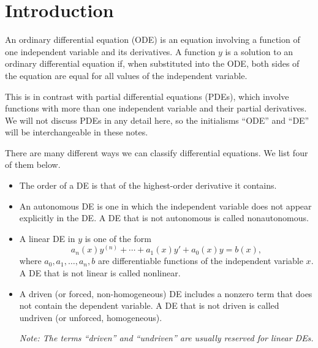 \documentclass[../m082main.tex]{subfiles}
\begin{document}
\chapter{Introduction}

\begin{definition}
    An ordinary differential equation (ODE) is an equation involving a function of one independent variable and its derivatives.
    A function $y$ is a solution to an ordinary differential equation if, when substituted into the ODE, both sides of the equation are equal for all values of the independent variable.
\end{definition}

This is in contrast with partial differential equations (PDEs), which involve functions with more than one independent variable and their partial derivatives.
We will not discuss PDEs in any detail here, so the initialisms ``ODE'' and ``DE'' will be interchangeable in these notes.

There are many different ways we can classify differential equations.
We list four of them below.

\begin{definition}
    \begin{itemize}
        \item The order of a DE is that of the highest-order derivative it contains.

        \item An autonomous DE is one in which the independent variable does not appear explicitly in the DE.
        A DE that is not autonomous is called nonautonomous.

        \item A linear DE in $y$ is one of the form
        \[ a_n(x)y^{(n)} + \cdots + a_1(x)y' + a_0(x)y = b(x), \]
        where $a_0, a_1, \ldots, a_n, b$ are differentiable functions of the independent variable $x$.
        A DE that is not linear is called nonlinear.

        \item A driven (or forced, non-homogeneous) DE includes a nonzero term that does not contain the dependent variable.
        A DE that is not driven is called undriven (or unforced, homogeneous).
    
        \medskip
        \textit{Note: The terms ``driven'' and ``undriven'' are usually reserved for linear DEs.}
    \end{itemize}
\end{definition}
\end{document}
